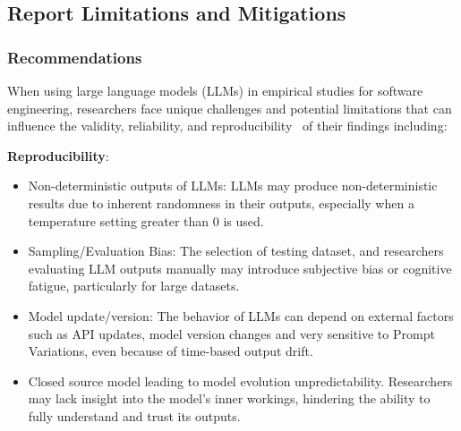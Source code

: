 \documentclass[11pt]{article}
\begin{document}
\subsection{Report Limitations and Mitigations}

\subsubsection{Recommendations}
When using large language models (LLMs) in empirical studies for software engineering, researchers face unique challenges and potential limitations that can influence the validity, reliability, and reproducibility~\cite{sallou2024breaking} of their findings including:

\textbf{Reproducibility}:
\begin{itemize}
  \item Non-deterministic outputs of LLMs: LLMs may produce non-deterministic results due to inherent randomness in their outputs, especially when a temperature setting greater than 0 is used.
  \item Sampling/Evaluation Bias: The selection of testing dataset, and researchers evaluating LLM outputs manually may introduce subjective bias or cognitive fatigue, particularly for large datasets.
  \item Model update/version:  The behavior of LLMs can depend on external factors such as API updates, model version changes and very sensitive to Prompt Variations, even because of time-based output drift.
  \item Closed source model leading to model evolution unpredictability. Researchers may lack insight into the model's inner workings, hindering the ability to fully understand and trust its outputs.
\end{itemize}
\end{document}

